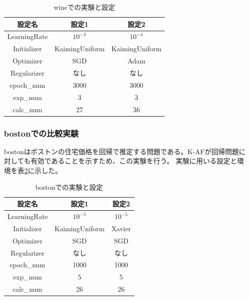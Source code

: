 \begin{table}[htbp]
    \begin{center}
        \caption{wineでの実験と設定}
        \label{exp:wine}
        \vspace{2mm} 
        \begin{tabular}{ |c|c|c| }
        \hline
        設定名 & 設定1 & 設定2 \\
        \hline
        LearningRate         & $ 10^{-3} $ & $ 10^{-4} $ \\
        \hline
        Initializer       & KaimingUniform & KaimingUniform \\
        \hline
        Optimizer           & SGD & Adam \\
        \hline
        Regularizer     & なし & なし \\
        \hline
        epoch\_num       & 3000 &  3000 \\
        \hline
        exp\_num         & 3 & 3 \\
        \hline
        calc\_num        & 27 & 36 \\
        \hline
        \end{tabular}
    \end{center}
\end{table}


\subsubsection{bostonでの比較実験}
\label{impl:boston}

bostonはボストンの住宅価格を回帰で推定する問題である。K-AFが回帰問題に対しても有効であることを示すため、この実験を行う。
実験に用いる設定と環境を表\ref{exp:boston}に示した。

\begin{table}[htbp]
    \begin{center}
        \caption{bostonでの実験と設定}
        \label{exp:boston}
        \vspace{2mm} 
        \begin{tabular}{ |c|c|c| }
        \hline
        設定名 & 設定1 & 設定2 \\
        \hline
        LearningRate         & $ 10^{-5} $ & $ 10^{-5} $ \\
        \hline
        Initializer       & KaimingUniform  & Xavier \\
        \hline
        Optimizer           & SGD & SGD \\
        \hline
        Regularizer     & なし & なし \\
        \hline
        epoch\_num       & 1000 &  1000 \\
        \hline
        exp\_num         & 5 & 5 \\
        \hline
        calc\_num        & 26 & 26 \\
        \hline
        \end{tabular}
    \end{center}
\end{table}

